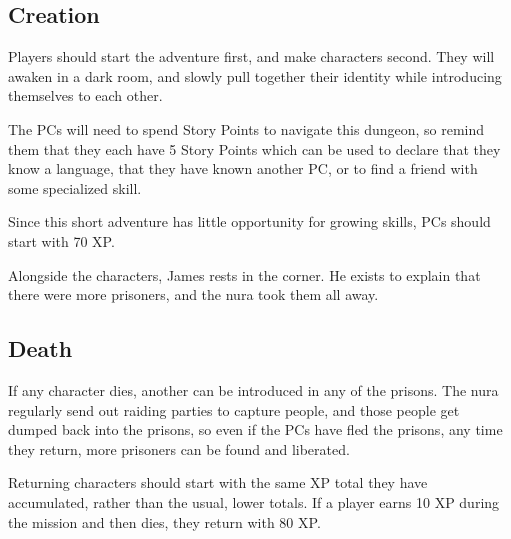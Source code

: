 \begin{multicols}{2}

\subsection{Creation}

Players should start the adventure first, and make characters second.
They will awaken in a dark room, and slowly pull together their identity while introducing themselves to each other.

The PCs will need to spend Story Points to navigate this dungeon, so remind them that they each have 5 Story Points which can be used to declare that they know a language, that they have known another PC, or to find a friend with some specialized skill.

Since this short adventure has little opportunity for growing skills, PCs should start with 70 XP.

Alongside the characters, James rests in the corner.
He exists to explain that there were more prisoners, and the nura took them all away.

\subsection{Death}

If any character dies, another can be introduced in any of the prisons.
The nura regularly send out raiding parties to capture people, and those people get dumped back into the prisons, so even if the PCs have fled the prisons, any time they return, more prisoners can be found and liberated.

Returning characters should start with the same XP total they have accumulated, rather than the usual, lower totals.
If a player earns 10 XP during the mission and then dies, they return with 80 XP.

\end{multicols}

